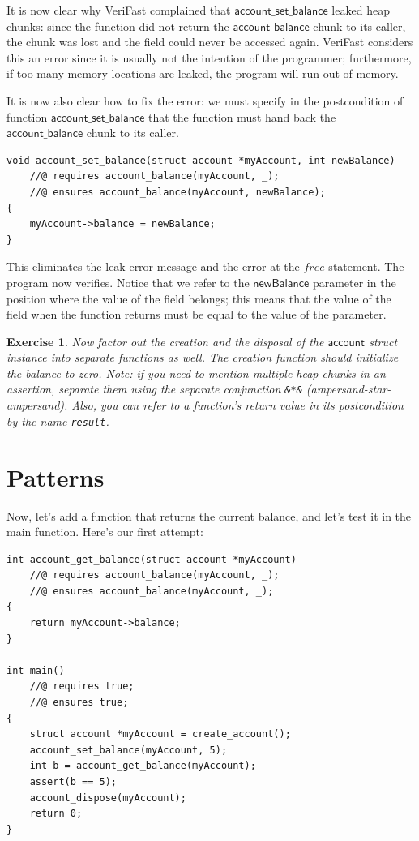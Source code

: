 \documentclass{article}
\newtheorem{exercise}{Exercise}
\begin{document}
It is now clear why VeriFast complained that
$\mathsf{account\_set\_balance}$ leaked heap chunks: since the
function did not return the $\mathsf{account\_balance}$ chunk
to its caller, the chunk was lost and the field could never be
accessed again. VeriFast considers this an error since it is
usually not the intention of the programmer; furthermore, if
too many memory locations are leaked, the program will run out
of memory.

It is now also clear how to fix the error: we must specify in
the postcondition of function $\mathsf{account\_set\_balance}$
that the function must hand back the
$\mathsf{account\_balance}$ chunk to its caller.
\begin{lstlisting}
void account_set_balance(struct account *myAccount, int newBalance)
    //@ requires account_balance(myAccount, _);
    //@ ensures account_balance(myAccount, newBalance);
{
    myAccount->balance = newBalance;
}
\end{lstlisting}
 This
eliminates the leak error message and the error at the
$\mathit{free}$ statement. The program now verifies. Notice
that we refer to the $\mathsf{newBalance}$ parameter in the
position where the value of the field belongs; this means that
the value of the field when the function returns must be equal
to the value of the parameter.

\begin{exercise}\label{exercise:account}
Now factor out the creation and the disposal of the
$\mathsf{account}$ struct instance into separate functions as
well. The creation function should initialize the balance to
zero. Note: if you need to mention multiple heap chunks in an
assertion, separate them using the \emph{separate conjunction}
\lstinline!&*&! (ampersand-star-ampersand). Also, you can refer
to a function's return value in its postcondition by the name
\lstinline!result!.
\end{exercise}

\section{Patterns}

Now, let's add a function that returns the current balance, and
let's test it in the main function. Here's our first attempt:

\begin{lstlisting}
int account_get_balance(struct account *myAccount)
    //@ requires account_balance(myAccount, _);
    //@ ensures account_balance(myAccount, _);
{
    return myAccount->balance;
}

int main()
    //@ requires true;
    //@ ensures true;
{
    struct account *myAccount = create_account();
    account_set_balance(myAccount, 5);
    int b = account_get_balance(myAccount);
    assert(b == 5);
    account_dispose(myAccount);
    return 0;
}
\end{lstlisting}
\end{document}

